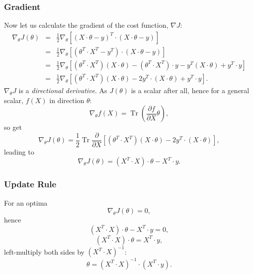 \documentclass[a4paper,11pt]{article}
\DeclareMathOperator{\tr}{Tr}
\begin{document}
\subsubsection{Gradient}
Now let us calculate the gradient of the cost function, \textcolor{OliveGreen}{$\nabla J$}:
\begin{eqnarray}
\nabla_\theta J \left( \theta \right) &=& \frac{1}{2} \nabla_\theta \left[ \left( X \cdot \theta - y \right)^T \cdot \left(X \cdot \theta - y \right) \right] \\
&=& \frac{1}{2} \nabla_\theta \left[ \left( \theta^T \cdot X^T - y^T \right) \cdot \left( X \cdot \theta - y \right) \right] \\
&=& \frac{1}{2} \nabla_\theta \left[ \left( \theta^T \cdot X^T \right) \left( X \cdot \theta \right) - \left( \theta^T \cdot X^T \right) \cdot y - y^T \left(X \cdot \theta \right) + y^T \cdot y \right]\\
&=& \frac{1}{2} \nabla_\theta \left[ \left( \theta^T \cdot X^T \right) \left( X \cdot \theta \right) - 2 y^T \cdot \left( X \cdot \theta \right) + y^T \cdot y \right] .
\end{eqnarray}
\textcolor{OliveGreen}{$\nabla_\theta J$} is a \textit{directional derivative}. As \textcolor{OliveGreen}{$J \left( \theta \right)$} is a scalar after all, hence for a general scalar, \textcolor{OliveGreen}{$f(X)$} in direction \textcolor{OliveGreen}{$\theta$}:
\begin{equation}
\nabla_\theta f \left(X \right) = \tr \left(\frac{\partial f}{\partial X} \theta \right) ,
\end{equation}
so get
\begin{equation}
\nabla_\theta J \left( \theta \right) = \frac{1}{2} \tr \frac{\partial}{\partial X} \left[ \left( \theta^T \cdot X^T \right) \left( X \cdot \theta \right) - 2 y^T \cdot \left( X \cdot \theta \right) \right] ,
\end{equation}
leading to
\begin{equation}
\nabla_\theta J \left( \theta \right) = \left( X^T \cdot X \right) \cdot \theta - X^T \cdot y .
\end{equation}
\subsubsection{Update Rule}
For an optima
\begin{equation}
\nabla_\theta J \left( \theta \right) = 0 ,
\end{equation}
hence
\begin{equation}
\left( X^T \cdot X \right) \cdot \theta - X^T \cdot y = 0 ,
\end{equation}
\begin{equation}
\left( X^T \cdot X \right) \cdot \theta = X^T \cdot y ,
\end{equation}
left-multiply both sides by \textcolor{OliveGreen}{$\left( X^T \cdot X \right) ^{-1}$}:
\begin{equation}
\theta = \left( X^T \cdot X \right) ^{-1} \cdot \left(X^T \cdot y \right) .
\end{equation}
\end{document}
